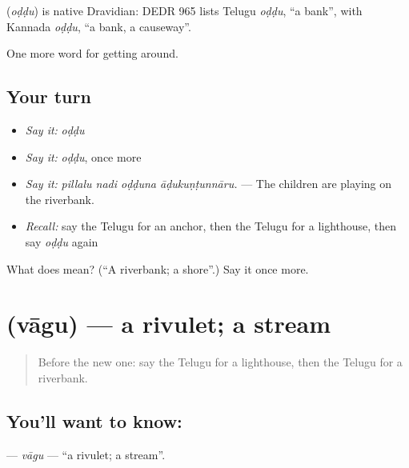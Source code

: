 \begin{cousinweb}
\textbf{} (\emph{oḍḍu}) is native Dravidian: DEDR 965 lists Telugu \emph{oḍḍu}, \textquotedblleft{}a bank\textquotedblright{}, with Kannada \emph{oḍḍu}, \textquotedblleft{}a bank, a causeway\textquotedblright{}.
\end{cousinweb}

\begin{grammarlens}[title={What you've built}]
One more word for getting around.
\end{grammarlens}

\subsection*{Your turn}
\begin{itemize}
\raggedright
  \item \emph{Say it:} \emph{oḍḍu}
  \item \emph{Say it:} \emph{oḍḍu}, once more
  \item \emph{Say it:} \emph{pillalu nadi oḍḍuna āḍukuṇṭunnāru.} — The children are playing on the riverbank.
  \item \emph{Recall:} say the Telugu for an anchor, then the Telugu for a lighthouse, then say \emph{oḍḍu} again
\end{itemize}

\begin{tcolorbox}[breakable,colback=teal!4,colframe=teal!35!black,title={Before you move on}]
What does  mean? (\textquotedblleft{}A riverbank; a shore\textquotedblright{}.) Say it once more.
\end{tcolorbox}
\section[\texorpdfstring{\te{వాగు} (vāgu)}{వాగు (vāgu)}]{ (vāgu) — a rivulet; a stream}

\label{lesson:TE-C453-vagu}



\begin{quote}
Before the new one: say the Telugu for a lighthouse, then the Telugu for a riverbank.
\end{quote}

\subsection*{You'll want to know: }
\textbf{} — \emph{vāgu} — \textquotedblleft{}a rivulet; a stream\textquotedblright{}.

